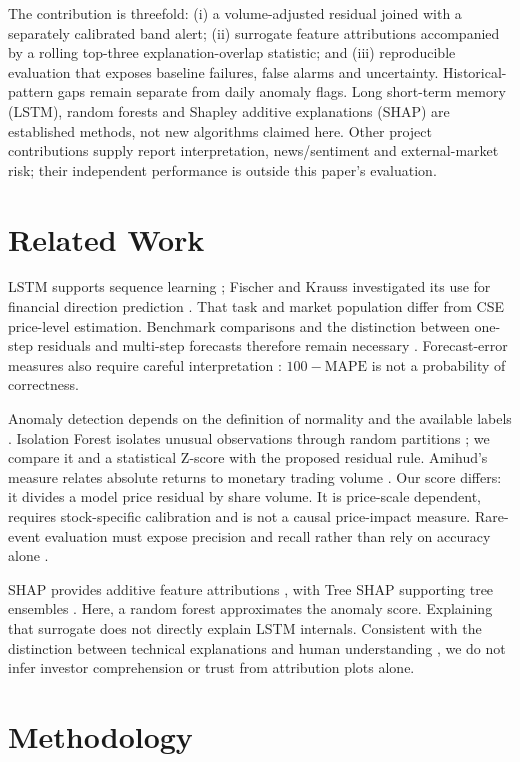\documentclass[conference]{IEEEtran}
\begin{document}
The contribution is threefold: (i) a volume-adjusted residual joined with a separately calibrated band alert; (ii) surrogate feature attributions accompanied by a rolling top-three explanation-overlap statistic; and (iii) reproducible evaluation that exposes baseline failures, false alarms and uncertainty. Historical-pattern gaps remain separate from daily anomaly flags. Long short-term memory (LSTM), random forests and Shapley additive explanations (SHAP) are established methods, not new algorithms claimed here. Other project contributions supply report interpretation, news/sentiment and external-market risk; their independent performance is outside this paper's evaluation.

\section{Related Work}
LSTM supports sequence learning \cite{hochreiter}; Fischer and Krauss investigated its use for financial direction prediction \cite{fischer}. That task and market population differ from CSE price-level estimation. Benchmark comparisons and the distinction between one-step residuals and multi-step forecasts therefore remain necessary \cite{hyndmanbook}. Forecast-error measures also require careful interpretation \cite{hyndmankoehler}: $100-\mathrm{MAPE}$ is not a probability of correctness.

Anomaly detection depends on the definition of normality and the available labels \cite{chandola}. Isolation Forest isolates unusual observations through random partitions \cite{isolation}; we compare it and a statistical Z-score with the proposed residual rule. Amihud's measure relates absolute returns to monetary trading volume \cite{amihud}. Our score differs: it divides a model price residual by share volume. It is price-scale dependent, requires stock-specific calibration and is not a causal price-impact measure. Rare-event evaluation must expose precision and recall rather than rely on accuracy alone \cite{saito}.

SHAP provides additive feature attributions \cite{shap}, with Tree SHAP supporting tree ensembles \cite{treeshap}. Here, a random forest \cite{breiman} approximates the anomaly score. Explaining that surrogate does not directly explain LSTM internals. Consistent with the distinction between technical explanations and human understanding \cite{miller}, we do not infer investor comprehension or trust from attribution plots alone.

\section{Methodology}
\end{document}
